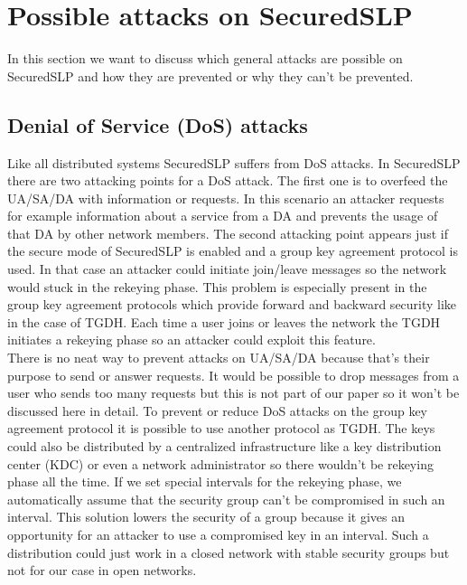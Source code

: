 \section{Possible attacks on SecuredSLP}
In this section we want to discuss which general attacks are possible on SecuredSLP and how they are prevented or why they can't be prevented.

\subsection{Denial of Service (DoS) attacks}\label{sec:DoS}
Like all distributed systems SecuredSLP suffers from DoS attacks. In SecuredSLP there are two attacking points for a DoS attack. The first one is to overfeed the UA/SA/DA with information or requests. In this scenario an attacker requests for example information about a service from a DA and prevents the usage of that DA by other network members. The second attacking point appears just if the secure mode of SecuredSLP is enabled and a group key agreement protocol is used. In that case an attacker could initiate join/leave messages so the network would stuck in the rekeying phase. This problem is especially present in the group key agreement protocols which provide forward and backward security like in the case of TGDH. Each time a user joins or leaves the network the TGDH initiates a rekeying phase so an attacker could exploit this feature.\\
There is no neat way to prevent attacks on UA/SA/DA because that's their purpose to send or answer requests. It would be possible to drop messages from a user who sends too many requests but this is not part of our paper so it won't be discussed here in detail. To prevent or reduce DoS attacks on the group key agreement protocol it is possible to use another protocol as TGDH. The keys could also be distributed by a centralized infrastructure like a key distribution center (KDC) or even a network administrator so there wouldn't be rekeying phase all the time. If we set special intervals for the rekeying phase, we automatically assume that the security group can't be compromised in such an interval. This solution lowers the security of a group because it gives an opportunity for an attacker to use a compromised key in an interval. Such a distribution could just work in a closed network with stable security groups but not for our case in open networks.

